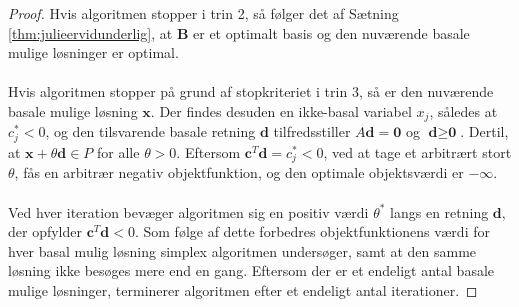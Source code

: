 \begin{proof}
Hvis algoritmen stopper i trin 2, så følger det af Sætning \ref{thm:julieervidunderlig}, at $\textbf{B}$ er et optimalt basis og den nuværende basale mulige løsninger er optimal.
\\\\
Hvis algoritmen stopper på grund af stopkriteriet i trin $3$, så er den nuværende basale mulige løsning $\textbf{x}$. 
Der findes desuden en ikke-basal variabel $x_j$, således at $c^*_j<0$, og den tilsvarende basale retning $\textbf{d}$ tilfredsstiller $A\textbf{d}=\textbf{0}$ og $\textbf{d} \geq \textbf{0}$. 
Dertil, at $\mathbf{x} +\theta \textbf{d}\in P$ for alle $\theta>0$. 
Eftersom $\textbf{c}^T\textbf{d}=c_j^*<0$, ved at tage et arbitrært stort $\theta$, fås en arbitrær negativ objektfunktion, og den optimale objektsværdi er $-\infty$.
\\\\
Ved hver iteration bevæger algoritmen sig en positiv værdi $\theta^*$ langs en retning $\textbf{d}$, der opfylder $\textbf{c}^T\textbf{d}<0$. 
Som følge af dette forbedres objektfunktionens værdi for hver basal mulig løsning simplex algoritmen undersøger, samt at den samme løsning ikke besøges mere end en gang. 
Eftersom der er et endeligt antal basale mulige løsninger, terminerer algoritmen efter et endeligt antal iterationer.
\end{proof}
%

